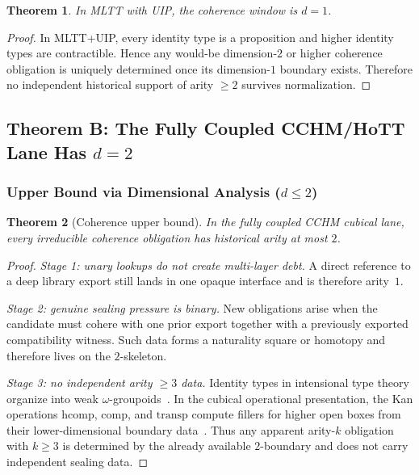 \documentclass[11pt,a4paper]{article}
\theoremstyle{plain}
\newtheorem{theorem}{Theorem}[section]
\theoremstyle{definition}
\theoremstyle{remark}
\newcommand{\hcomp}{\mathrm{hcomp}}
\newcommand{\compop}{\mathrm{comp}}
\newcommand{\transp}{\mathrm{transp}}
\begin{document}
\begin{theorem}
\label{thm:extensional}
In MLTT with UIP, the coherence window is $d=1$.
\end{theorem}

\begin{proof}
In MLTT+UIP, every identity type is a proposition and higher identity types are contractible.  Hence any would-be dimension-$2$ or higher coherence obligation is uniquely determined once its dimension-$1$ boundary exists.  Therefore no independent historical support of arity $\ge 2$ survives normalization.
\end{proof}

\subsection{\texorpdfstring{Theorem B: The Fully Coupled CCHM/HoTT Lane Has $d=2$}{Theorem B: The Fully Coupled CCHM/HoTT Lane Has d=2}}

\subsubsection{\texorpdfstring{Upper Bound via Dimensional Analysis ($d\le 2$)}{Upper Bound via Dimensional Analysis}}

\begin{theorem}[Coherence upper bound]
\label{thm:upper}
In the fully coupled CCHM cubical lane, every irreducible coherence obligation has historical arity at most $2$.
\end{theorem}

\begin{proof}
\emph{Stage 1: unary lookups do not create multi-layer debt.}
A direct reference to a deep library export still lands in one opaque interface and is therefore arity~$1$.

\emph{Stage 2: genuine sealing pressure is binary.}
New obligations arise when the candidate must cohere with one prior export together with a previously exported compatibility witness.  Such data forms a naturality square or homotopy and therefore lives on the $2$-skeleton.

\emph{Stage 3: no independent arity $\ge 3$ data.}
Identity types in intensional type theory organize into weak $\omega$-groupoids~\cite{lumsdaine,vdberg-garner}.  In the cubical operational presentation, the Kan operations $\hcomp$, $\compop$, and $\transp$ compute fillers for higher open boxes from their lower-dimensional boundary data~\cite{cubical,cchm-hits}.  Thus any apparent arity-$k$ obligation with $k\ge 3$ is determined by the already available $2$-boundary and does not carry independent sealing data.
\end{proof}
\end{document}
